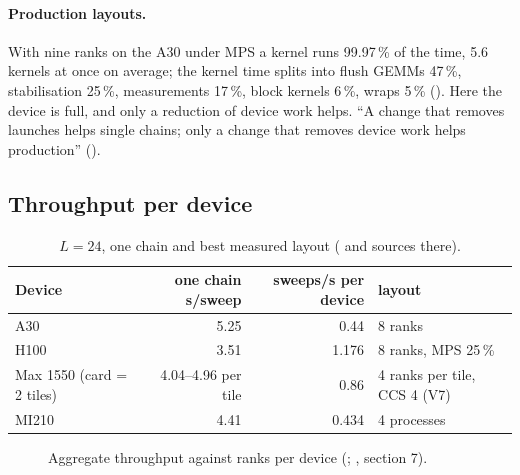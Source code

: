 

\paragraph{Production layouts.} With nine ranks on the A30 under MPS a kernel runs 99.97\,\% of the time, 5.6 kernels at once on average; the kernel time splits into flush GEMMs 47\,\%, stabilisation 25\,\%, measurements 17\,\%, block kernels 6\,\%, wraps 5\,\% (). %
Here the device is full, and only a reduction of device work helps. ``A change that removes launches helps single chains; only a change that removes device work helps production'' ().



\subsection{Throughput per device}

\begin{table}[h]
\centering\small
\caption{$L=24$, one chain and best measured layout ( and sources there).}
\label{tab:platforms}
\begin{tabular}{@{}lrrl@{}}
\toprule
Device & one chain s/sweep & sweeps/s per device & layout \\
\midrule
A30 & 5.25 & 0.44 & 8 ranks \\ %
H100 & 3.51 & 1.176 & 8 ranks, MPS 25\,\% \\ %
Max 1550 (card = 2 tiles) & 4.04--4.96 per tile & 0.86 & 4 ranks per tile, CCS 4 (V7) \\ %
MI210 & 4.41 & 0.434 & 4 processes \\ %
\bottomrule
\end{tabular}
\end{table}

\begin{figure}[h]
\centering
{}
\caption{Aggregate throughput against ranks per device (; , section 7).}
\label{fig:mps}
\end{figure}

